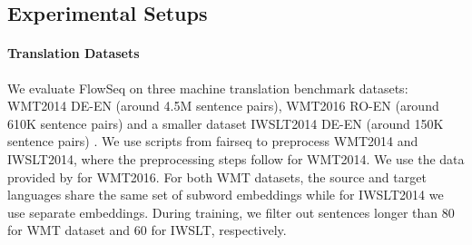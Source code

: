 \documentclass[11pt,a4paper]{article}
\begin{document}
\subsection{Experimental Setups}
\paragraph{Translation Datasets}
We evaluate FlowSeq on three machine translation benchmark datasets: WMT2014 DE-EN (around 4.5M sentence pairs), WMT2016 RO-EN (around 610K sentence pairs) and a smaller dataset IWSLT2014 DE-EN (around 150K sentence pairs) \cite{cettolo2012wit3}. We use scripts from fairseq \cite{ott2019fairseq} to preprocess WMT2014 and IWSLT2014, where the preprocessing steps follow  \citet{vaswani2017attention} for WMT2014. We use the data provided by \citet{lee2018deterministic} for WMT2016. For both WMT datasets, the source and target languages share the same set of subword embeddings while for IWSLT2014 we use separate embeddings.
During training, we filter out sentences longer than $80$ for WMT dataset and $60$ for IWSLT, respectively.
\end{document}
